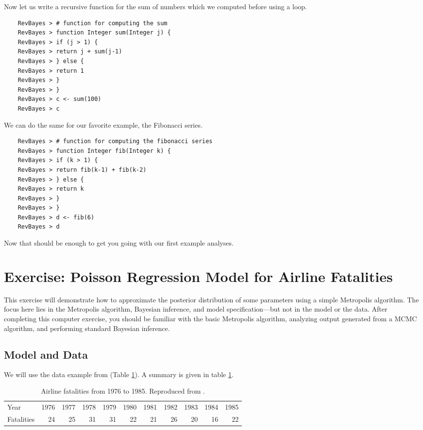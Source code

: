 Now let us write a recursive function for the sum of numbers which we computed before using a  loop.
{\tt \begin{snugshade*}
\begin{lstlisting}    
    RevBayes > # function for computing the sum
    RevBayes > function Integer sum(Integer j) {
    RevBayes > if (j > 1) {
    RevBayes > return j + sum(j-1)
    RevBayes > } else {
    RevBayes > return 1
    RevBayes > }
    RevBayes > }
    RevBayes > c <- sum(100)
    RevBayes > c
\end{lstlisting}
\end{snugshade*}}
We can do the same for our favorite example, the Fibonacci series.
{\tt \begin{snugshade*}
\begin{lstlisting}    
    RevBayes > # function for computing the fibonacci series
    RevBayes > function Integer fib(Integer k) {
    RevBayes > if (k > 1) {
    RevBayes > return fib(k-1) + fib(k-2)
    RevBayes > } else {
    RevBayes > return k
    RevBayes > }
    RevBayes > }
    RevBayes > d <- fib(6)
    RevBayes > d
\end{lstlisting}
\end{snugshade*}}
Now that should be enough to get you going with our first example analyses.




\newpage
\FloatBarrier
\section{Exercise: Poisson Regression Model for Airline Fatalities}

This exercise will demonstrate how to approximate the posterior distribution of some parameters using a simple Metropolis algorithm. 
The focus here lies in the Metropolis algorithm, Bayesian inference, and model specification---but not in the model or the data. 
After completing this computer exercise, you should be familiar with the basic Metropolis algorithm, analyzing output generated from a MCMC algorithm, and performing standard Bayesian inference.

\subsection*{Model and Data}
We will use the data example from \cite{gelman95} (Table \ref{tab:airlineFatalities}). 
A summary is given in table \ref{tab:airlineFatalities}.
\begin{table}[!hbtp]
\caption{Airline fatalities from 1976 to 1985. Reproduced from \cite[][Table 2.2 on p. 69]{gelman95}.}
\label{tab:airlineFatalities}
\smallskip
\centering
\begin{tabular}{ l | r r r r r r r r r r }
  \hline                       
  Year & 1976 & 1977 & 1978 & 1979 & 1980 & 1981 & 1982 & 1983 & 1984 & 1985 \\
  Fatalities & 24 & 25 & 31 & 31 & 22 & 21 & 26 & 20 & 16 & 22\\
  \hline  
\end{tabular}
\end{table}

